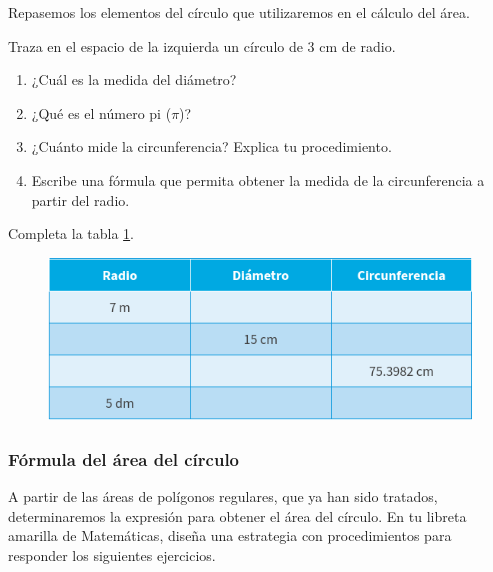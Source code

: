 \documentclass[11pt]{book}
\begin{document}
Repasemos los elementos del círculo que utilizaremos en el cálculo del área.\\

\begin{enumerate}
  \begin{minipage}[t]{0.35\textwidth}

  \end{minipage}\hfill
  \begin{minipage}[t]{0.55\textwidth}
    \item Traza en el espacio de la izquierda un círculo de 3 cm de radio.\\

    \begin{enumerate}
      \item ¿Cuál es la medida del diámetro?\\
      \item ¿Qué es el número pi ($\pi$)?\\
      \item ¿Cuánto mide la circunferencia? Explica tu procedimiento.\\
      \item Escribe una fórmula que permita obtener la medida de la circunferencia a partir del radio.
    \end{enumerate}
  \end{minipage}

  \newpage
  \item Completa la tabla \ref{tab:tabla_circunferencia}.

        \begin{figure}[H]
          \centering
          \includegraphics[width=.6\linewidth]{tabla_circunferencia.png}
          \label{tab:tabla_circunferencia}
        \end{figure}

        \subsubsection{Fórmula del área del círculo}
        A partir de las áreas de polígonos regulares, que ya han sido tratados, determinaremos la expresión para obtener el área del círculo.
        En tu {\color{YellowOrange}libreta amarilla} de Matem\'aticas, diseña una estrategia con procedimientos para responder los siguientes ejercicios.


\end{enumerate}
\end{document}
